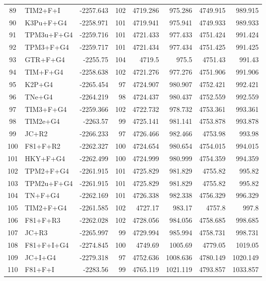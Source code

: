 \begin{longtable}{clrrrrrr}
	89 & TIM2+F+I & -2257.643 & 102 & 4719.286 & 975.286 & 4749.915 & 989.915 \\ 
	90 & K3Pu+F+G4 & -2258.971 & 101 & 4719.941 & 975.941 & 4749.933 & 989.933 \\ 
	91 & TPM3u+F+G4 & -2259.716 & 101 & 4721.433 & 977.433 & 4751.424 & 991.424 \\ 
	92 & TPM3+F+G4 & -2259.717 & 101 & 4721.434 & 977.434 & 4751.425 & 991.425 \\ 
	93 & GTR+F+G4 & -2255.75 & 104 & 4719.5 & 975.5 & 4751.43 & 991.43 \\ 
	94 & TIM+F+G4 & -2258.638 & 102 & 4721.276 & 977.276 & 4751.906 & 991.906 \\ 
	95 & K2P+G4 & -2265.454 & 97 & 4724.907 & 980.907 & 4752.421 & 992.421 \\ 
	96 & TNe+G4 & -2264.219 & 98 & 4724.437 & 980.437 & 4752.559 & 992.559 \\ 
	97 & TIM3+F+G4 & -2259.366 & 102 & 4722.732 & 978.732 & 4753.361 & 993.361 \\ 
	98 & TIM2e+G4 & -2263.57 & 99 & 4725.141 & 981.141 & 4753.878 & 993.878 \\ 
	99 & JC+R2 & -2266.233 & 97 & 4726.466 & 982.466 & 4753.98 & 993.98 \\ 
	100 & F81+F+R2 & -2262.327 & 100 & 4724.654 & 980.654 & 4754.015 & 994.015 \\ 
	101 & HKY+F+G4 & -2262.499 & 100 & 4724.999 & 980.999 & 4754.359 & 994.359 \\ 
	102 & TPM2+F+G4 & -2261.915 & 101 & 4725.829 & 981.829 & 4755.82 & 995.82 \\ 
	103 & TPM2u+F+G4 & -2261.915 & 101 & 4725.829 & 981.829 & 4755.82 & 995.82 \\ 
	104 & TN+F+G4 & -2262.169 & 101 & 4726.338 & 982.338 & 4756.329 & 996.329 \\ 
	105 & TIM2+F+G4 & -2261.585 & 102 & 4727.17 & 983.17 & 4757.8 & 997.8 \\ 
	106 & F81+F+R3 & -2262.028 & 102 & 4728.056 & 984.056 & 4758.685 & 998.685 \\ 
	107 & JC+R3 & -2265.997 & 99 & 4729.994 & 985.994 & 4758.731 & 998.731 \\ 
	108 & F81+F+I+G4 & -2274.845 & 100 & 4749.69 & 1005.69 & 4779.05 & 1019.05 \\ 
	109 & JC+I+G4 & -2279.318 & 97 & 4752.636 & 1008.636 & 4780.149 & 1020.149 \\ 
	110 & F81+F+I & -2283.56 & 99 & 4765.119 & 1021.119 & 4793.857 & 1033.857 \\ 

\end{longtable}

